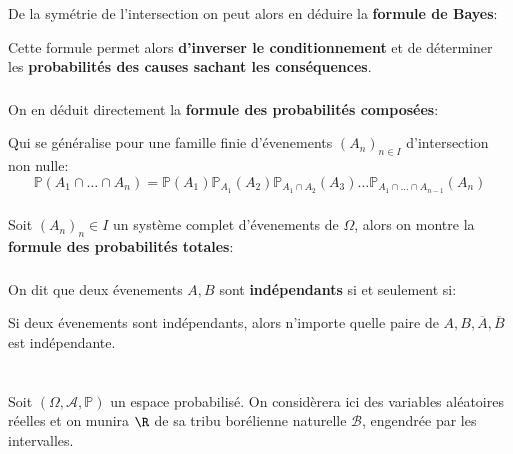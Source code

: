 De la symétrie de l'intersection on peut alors en déduire la \textbf{formule de Bayes}:

Cette formule permet alors \textbf{d'inverser le conditionnement} et de déterminer les \textbf{probabilités des causes sachant les conséquences}.

\subsection*{}
On en déduit directement la \textbf{formule des probabilités composées}:

Qui se généralise pour une famille finie d'évenements \((A_n)_{n \in I}\) d'intersection non nulle:
\[
   \mathbb{P}(A_1 \cap \ldots \cap A_n) = \mathbb{P}(A_1)\mathbb{P}_{A_1}(A_2)\mathbb{P}_{A_1\cap A_2}(A_3)\ldots\mathbb{P}_{A_1\cap \ldots \cap A_{n-1}}(A_n)
\]

\subsection*{}
Soit \((A_n)_n \in I\) un système complet d'évenements de \(\Omega\), alors on montre la \textbf{formule des probabilités totales}:


\subsection*{}
On dit que deux évenements \(A, B\) sont \textbf{indépendants} si et seulement si:

Si deux évenements sont indépendants, alors n'importe quelle paire de \(A, B, \overline{A}, \overline{B}\) est indépendante.
\chapter*{} %

Soit \((\Omega, \mathscr{A}, \mathbb{P})\) un espace probabilisé. On considèrera ici des variables aléatoires réelles et on munira \(\R\) de sa tribu borélienne naturelle \(\mathscr{B}\), engendrée par les intervalles.\<

